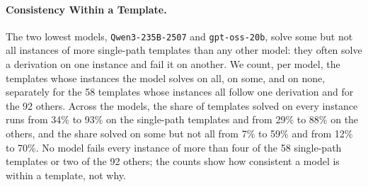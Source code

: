\paragraph{Consistency Within a Template.} The two lowest models, \texttt{Qwen3-235B-2507} and
\texttt{gpt-oss-20b}, solve some but not all instances of more single-path templates than any other
model: they often solve a derivation on one instance and fail it on another.
We count, per model, the templates whose instances the model solves on all, on some, and on none,
separately for the 58 templates whose instances all follow one derivation and for the 92 others.
Across the models, the share of templates solved on every instance runs from 34\% to 93\% on the
single-path templates and from 29\% to 88\% on the others, and the share solved on some but not
all from 7\% to 59\% and from 12\% to 70\%.
No model fails every instance of more than four of the 58 single-path templates or two of the 92
others; the counts show how consistent a model is within a template, not why.

